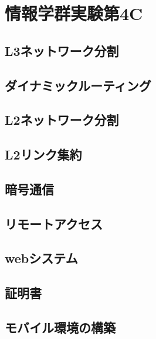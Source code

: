 \documentclass[10pt]{text2002}
\begin{document}
\part{情報学群実験第4C}\label{part:2}

\chapter{L3ネットワーク分割}\label{ch:l3}


\chapter{ダイナミックルーティング}\label{ch:drouting}


\chapter{L2ネットワーク分割}\label{ch:l2}


\chapter{L2リンク集約}\label{ch:lag}


\chapter{暗号通信}\label{ch:crypt}


\chapter{リモートアクセス}\label{ch:remote}


\chapter{webシステム}\label{ch:websystem}


\chapter{証明書}\label{ch:cert}


\chapter{モバイル環境の構築}\label{ch:mobile}

\end{document}
